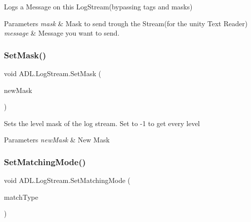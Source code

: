 Logs a Message on this Log\+Stream(bypassing tags and masks) 


\begin{DoxyParams}{Parameters}
{\em mask} & Mask to send trough the Stream(for the unity Text Reader)\\
\hline
{\em message} & Message you want to send.\\
\hline
\end{DoxyParams}
\mbox{\label{class_a_d_l_1_1_log_stream_a7a1a25f0247d4ebfeb5a4d6e37fe4e3a}} 
\subsubsection{\texorpdfstring{Set\+Mask()}{SetMask()}}
{\footnotesize\ttfamily void A\+D\+L.\+Log\+Stream.\+Set\+Mask (\begin{DoxyParamCaption}\item[{int}]{new\+Mask }\end{DoxyParamCaption})}



Sets the level mask of the log stream. Set to -\/1 to get every level 


\begin{DoxyParams}{Parameters}
{\em new\+Mask} & New Mask\\
\hline
\end{DoxyParams}
\mbox{\label{class_a_d_l_1_1_log_stream_af66833a158ebb7d8e079810bb2b8f50e}} 
\subsubsection{\texorpdfstring{Set\+Matching\+Mode()}{SetMatchingMode()}}
{\footnotesize\ttfamily void A\+D\+L.\+Log\+Stream.\+Set\+Matching\+Mode (\begin{DoxyParamCaption}\item[{\mbox{\hyperlink{namespace_a_d_l_af6334296dbae0383a652317263f0bc05}{Match\+Type}}}]{match\+Type }\end{DoxyParamCaption})}



